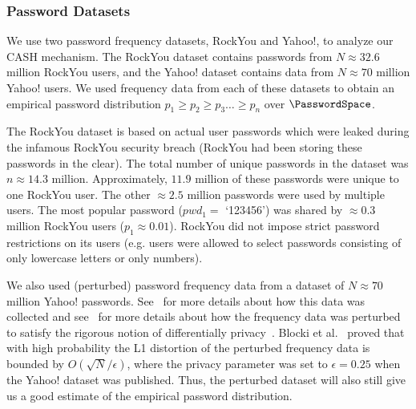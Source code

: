 \subsubsection{Password Datasets} \label{subsubsec:RockYou} We use two password frequency datasets, RockYou and Yahoo!, to analyze our CASH mechanism. The RockYou dataset contains passwords from $N\approx 32.6$ million RockYou users, and the Yahoo! dataset contains data from $N\approx 70$ million Yahoo! users. We used frequency data from each of these datasets to obtain an empirical password distribution $p_1 \geq p_2 \geq p_3 \ldots \geq p_n$ over $\PasswordSpace$. 

The RockYou dataset is based on actual user passwords which were leaked during the infamous RockYou security breach (RockYou had been storing these passwords in the clear). The total number of unique passwords in the dataset was $n \approx 14.3$ million. Approximately, $11.9$ million of these passwords were unique to one RockYou user. The other $\approx 2.5$ million passwords were used by multiple users. The most popular password ($pwd_1=$ `123456') was shared by $\approx 0.3$ million RockYou users ($p_1 \approx 0.01$). RockYou did not impose strict password restrictions on its users (e.g. users were allowed to select passwords consisting of only lowercase letters or only numbers). 

We also used (perturbed) password frequency data from a dataset of $N\approx 70$ million Yahoo! passwords. See~\cite{bonneau2012science} for more details about how this data was collected and see~\cite{blocki2016differentially} for more details about how the frequency data was perturbed to satisfy the rigorous notion of differentially privacy~\cite{dwork2006calibrating}. Blocki et al.~\cite{blocki2016differentially} proved that with high probability the L1 distortion of the perturbed frequency data is bounded by $O\left( \sqrt{N}/\epsilon\right)$, where the privacy parameter was set to $\epsilon=0.25$ when the Yahoo! dataset was published. Thus, the perturbed dataset will also still give us a good estimate of the empirical password distribution.  

